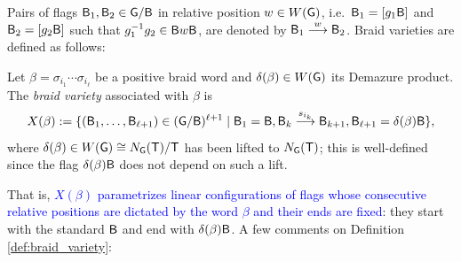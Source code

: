 Pairs of flags $\mathsf{B}_1,\mathsf{B}_2\in \mathsf{G}/\mathsf{B}$ in relative position $w\in W(\mathsf{G})$, i.e.~$\mathsf{B}_1=[g_1\mathsf{B}]$ and $\mathsf{B}_2=[g_2\mathsf{B}]$ such that $g_1^{-1}g_2\in \mathsf{B} w\mathsf{B}$, are denoted by $\borel_1 \buildrel w \over \longrightarrow \borel_2$. Braid varieties are defined as follows:\\

\begin{fdef}\label{def:braid_variety}
Let $\beta = \sigma_{i_1}\cdots \sigma_{i_{\ell}}$ be a positive braid word and $\delta(\beta) \in W(\mathsf{G})$ its Demazure product. The {\it braid variety} associated with $\beta$ is
\begin{equation}\label{eq:braid_variety}
X(\beta) := \{(\borel_1, \dots, \borel_{\ell+1}) \in (\G/\borel)^{\ell + 1} \mid \borel_1 = \borel, \borel_{k} \buildrel s_{i_{k}} \over \longrightarrow \borel_{k+1}, \borel_{\ell + 1} = \delta(\beta) \borel \},
\end{equation}
\noindent where $\delta(\beta) \in W(\mathsf{G}) \cong N_{\mathsf{G}}(\mathsf{T})/\mathsf{T}$ has been lifted to $N_{\mathsf{G}}(\mathsf{T})$; this is well-defined since the flag $\delta(\beta) \mathsf{B}$ does not depend on such a lift.
\end{fdef}
\vspace{0.2cm}
\noindent That is, \textcolor{blue}{$X(\beta)$ parametrizes linear configurations of flags whose consecutive relative positions are dictated by the word $\beta$ and their ends are fixed}: they start with the standard $\mathsf{B}$ and end with $\delta(\beta)\mathsf{B}$. A few comments on Definition \ref{def:braid_variety}:
